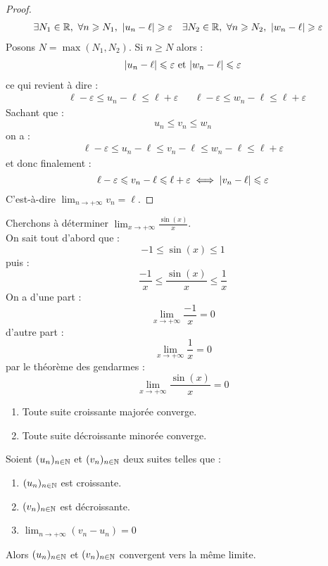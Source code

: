 \begin{proof}
    \begin{align*}
        &\exists N_1 \in \mathbb{R},\ \forall n \geqslant N_1,\ \abs{u_n - \ell} \geqslant \varepsilon &
        &\exists N_2 \in \mathbb{R},\ \forall n \geqslant N_2,\ \abs{w_n - \ell} \geqslant \varepsilon
    \end{align*}
    Posons $N = \max(N_1, N_2)$. Si $n \geq N$ alors :
    \begin{align*}
        \abs{u_n - \ell} \leqslant \varepsilon \text{ et } \abs{w_n - \ell} \leqslant \varepsilon
    \end{align*}
    ce qui revient à dire : 
    \begin{align*}
        &\ell - \varepsilon \leq u_n - \ell \leq \ell + \varepsilon & &\ell - \varepsilon \leq w_n - \ell \leq \ell + \varepsilon
    \end{align*}
    Sachant que :
    \[ u_n \leq v_n \leq w_n \]
    on a :
    \begin{align*}
        \ell - \varepsilon \leq u_n - \ell \leq v_n - \ell \leq w_n - \ell \leq \ell + \varepsilon
    \end{align*}
    et donc finalement :
    \[ \ell - \varepsilon \leqslant v_n - \ell \leqslant \ell + \varepsilon \iff \abs{v_n - \ell} \leqslant \varepsilon \]
    C'est-à-dire $\lim_{n \to +\infty} v_n = \ell$.
\end{proof}

\begin{example}
	Cherchons à déterminer $\lim_{x \to +\infty} \frac{\sin(x)}{x}$.
	\\
	On sait tout d'abord que :
	\[ -1 \leq \sin(x) \leq 1 \]
	puis :
	\[ \frac{-1}{x} \leq \frac{\sin(x)}{x} \leq \frac{1}{x} \]
	On a d'une part :
	\[ \lim_{x \to +\infty} \frac{-1}{x} = 0 \]
	d'autre part :
	\[ \lim_{x \to +\infty} \frac{1}{x} = 0 \]
	par le théorème des gendarmes :
	\[ \lim_{x \to + \infty} \frac{\sin(x)}{x} = 0 \]
\end{example}

\begin{theorem}
    \begin{enumerate}
        \item Toute suite croissante majorée converge.
        \item Toute suite décroissante minorée converge.
    \end{enumerate}
\end{theorem}

\begin{theorem}
    Soient $(u_n)_{n \in \mathbb{N}}$ et $(v_n)_{n \in \mathbb{N}}$ deux suites telles que :
    \begin{enumerate}
            \item $(u_n)_{n \in \mathbb{N}}$ est croissante.
            \item $(v_n)_{n \in \mathbb{N}}$ est décroissante.
            \item $\lim_{n \to +\infty} (v_n - u_n) = 0$
        \end{enumerate}
    \noindent Alors $(u_n)_{n \in \mathbb{N}}$ et $(v_n)_{n \in \mathbb{N}}$ convergent vers la même limite.
\end{theorem}

